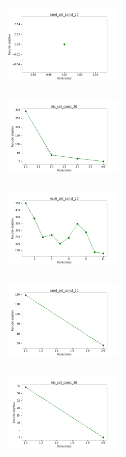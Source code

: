 \begin{figure}[H]
\begin{subfigure}
    \end{subfigure}
    \hfill
    \begin{subfigure}
        \centering
        \includegraphics[width=0.32\textwidth]{img/copkm/rand_set_const_20_589741062_cost.png}
    \end{subfigure}
    \hfill
    \begin{subfigure}
        \centering
        \includegraphics[width=0.32\textwidth]{img/copkm/iris_set_const_20_277451237_cost.png}
    \end{subfigure}
    \hfill
    \begin{subfigure}
        \centering
        \includegraphics[width=0.32\textwidth]{img/copkm/ecoli_set_const_20_277451237_cost.png}
    \end{subfigure}
    \hfill
    \begin{subfigure}
        \centering
        \includegraphics[width=0.32\textwidth]{img/copkm/rand_set_const_20_277451237_cost.png}
    \end{subfigure}
    \hfill
    \begin{subfigure}
        \centering
        \includegraphics[width=0.32\textwidth]{img/copkm/iris_set_const_20_49258669_cost.png}

\end{subfigure}
\end{figure}
